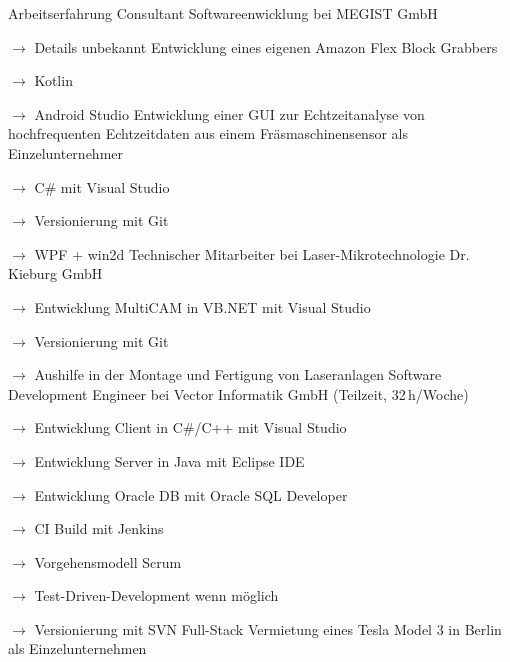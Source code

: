 \begin{rubric}{\textcolor{black!20!blue!100}{Arbeitserfahrung}}%
		\entry*[05/2023 --- 12/2024]
			Consultant Softwareenwicklung bei \glqq MEGIST GmbH\grqq
			
			\setlength{\hangindent}{\widthof{$\rightarrow$ }}
			$\rightarrow$ Details unbekannt
		\entry*[2021 --- 2022]
			Entwicklung eines eigenen Amazon Flex Block Grabbers
			
			\setlength{\hangindent}{\widthof{$\rightarrow$ }}
			$\rightarrow$ Kotlin
			
			$\rightarrow$ Android Studio
		\entry*[03/2020 --- 05/2020]
			Entwicklung einer GUI zur Echtzeitanalyse von hochfrequenten Echtzeitdaten aus einem Fräsmaschinensensor als Einzelunternehmer
			
			\setlength{\hangindent}{\widthof{$\rightarrow$ }}
			$\rightarrow$ C\# mit Visual Studio
			
			$\rightarrow$ Versionierung mit Git
			
			$\rightarrow$ WPF + win2d
		\entry*[04/07/2019 --- 30/09/2020]
			Technischer Mitarbeiter bei \glqq Laser-Mikrotechnologie Dr. Kieburg GmbH\grqq
			
			\setlength{\hangindent}{\widthof{$\rightarrow$ }}
			$\rightarrow$ Entwicklung MultiCAM in VB.NET mit Visual Studio
			
			$\rightarrow$ Versionierung mit Git
			
			$\rightarrow$ Aushilfe in der Montage und Fertigung von Laseranlagen
		\entry*[11/2017 --- 03/2019]
			Software Development Engineer bei Vector Informatik GmbH (Teilzeit, 32\,h/Woche)
			
			\setlength{\hangindent}{\widthof{$\rightarrow$ }}
			$\rightarrow$ Entwicklung Client in C\#/C++ mit Visual Studio
			
			$\rightarrow$ Entwicklung Server in Java mit Eclipse IDE
			
			$\rightarrow$ Entwicklung Oracle DB mit Oracle SQL Developer
			
			$\rightarrow$ CI Build mit Jenkins
			
			$\rightarrow$ Vorgehensmodell Scrum
			
			$\rightarrow$ Test-Driven-Development wenn möglich
			
			$\rightarrow$ Versionierung mit SVN
		\entry*[10/2019 --- 03/2023]
			Full-Stack Vermietung eines Tesla Model 3 in Berlin als Einzelunternehmen
			

\end{rubric}
